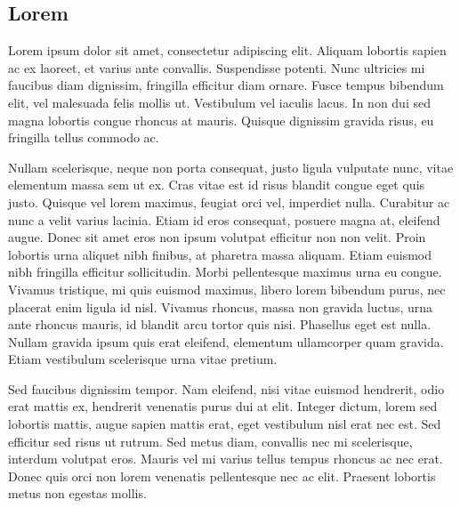 \documentclass[a0,landscape]{a0poster}
\begin{document}
\begin{multicols*}{3}

\begin{abstract}
Exactly-once semantics without high latency overhead is still hard to achieve within state-of-the-art stream processing systems. We introduce a model providing for exactly-once using lightweight optimistic approach for obtaining determinism and idempotence. We show its feasibility with a prototype.
\end {abstract}

\section{Lorem}

  Lorem ipsum dolor sit amet, consectetur adipiscing elit. Aliquam lobortis sapien ac ex laoreet, et varius ante convallis. Suspendisse potenti. Nunc ultricies mi faucibus diam dignissim, fringilla efficitur diam ornare. Fusce tempus bibendum elit, vel malesuada felis mollis ut. Vestibulum vel iaculis lacus. In non dui sed magna lobortis congue rhoncus at mauris. Quisque dignissim gravida risus, eu fringilla tellus commodo ac.

  Nullam scelerisque, neque non porta consequat, justo ligula vulputate nunc, vitae elementum massa sem ut ex. Cras vitae est id risus blandit congue eget quis justo. Quisque vel lorem maximus, feugiat orci vel, imperdiet nulla. Curabitur ac nunc a velit varius lacinia. Etiam id eros consequat, posuere magna at, eleifend augue. Donec sit amet eros non ipsum volutpat efficitur non non velit. Proin lobortis urna aliquet nibh finibus, at pharetra massa aliquam. Etiam euismod nibh fringilla efficitur sollicitudin. Morbi pellentesque maximus urna eu congue. Vivamus tristique, mi quis euismod maximus, libero lorem bibendum purus, nec placerat enim ligula id nisl. Vivamus rhoncus, massa non gravida luctus, urna ante rhoncus mauris, id blandit arcu tortor quis nisi. Phasellus eget est nulla. Nullam gravida ipsum quis erat eleifend, elementum ullamcorper quam gravida. Etiam vestibulum scelerisque urna vitae pretium.

  Sed faucibus dignissim tempor. Nam eleifend, nisi vitae euismod hendrerit, odio erat mattis ex, hendrerit venenatis purus dui at elit. Integer dictum, lorem sed lobortis mattis, augue sapien mattis erat, eget vestibulum nisl erat nec est. Sed efficitur sed risus ut rutrum. Sed metus diam, convallis nec mi scelerisque, interdum volutpat eros. Mauris vel mi varius tellus tempus rhoncus ac nec erat. Donec quis orci non lorem venenatis pellentesque nec ac elit. Praesent lobortis metus non egestas mollis.


\end{multicols*}
\end{document}
